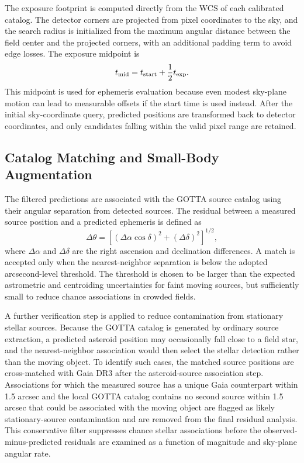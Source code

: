 \documentclass[referee]{raa}
\begin{document}
The exposure footprint is computed directly from the WCS of each calibrated catalog. The detector corners are projected from pixel coordinates to the sky, and the search radius is initialized from the maximum angular distance between the field center and the projected corners, with an additional padding term to avoid edge losses. The exposure midpoint is
\begin{equation}
t_{\rm mid}=t_{\rm start}+\frac{1}{2}t_{\rm exp}.
\end{equation}
This midpoint is used for ephemeris evaluation because even modest sky-plane motion can lead to measurable offsets if the start time is used instead. After the initial sky-coordinate query, predicted positions are transformed back to detector coordinates, and only candidates falling within the valid pixel range are retained.

\subsection{Catalog Matching and Small-Body Augmentation}

The filtered predictions are associated with the GOTTA source catalog using their angular separation from detected sources. The residual between a measured source position and a predicted ephemeris is defined as
\begin{equation}
\Delta\theta =
\left[
(\Delta\alpha\cos\delta)^2 + (\Delta\delta)^2
\right]^{1/2},
\end{equation}
where $\Delta\alpha$ and $\Delta\delta$ are the right ascension and declination differences. A match is accepted only when the nearest-neighbor separation is below the adopted arcsecond-level threshold. The threshold is chosen to be larger than the expected astrometric and centroiding uncertainties for faint moving sources, but sufficiently small to reduce chance associations in crowded fields.

A further verification step is applied to reduce contamination from stationary stellar sources. Because the GOTTA catalog is generated by ordinary source extraction, a predicted asteroid position may occasionally fall close to a field star, and the nearest-neighbor association would then select the stellar detection rather than the moving object. To identify such cases, the matched source positions are cross-matched with Gaia DR3 \citep{Gaia2023} after the asteroid-source association step. Associations for which the measured source has a unique Gaia counterpart within 1.5 arcsec and the local GOTTA catalog contains no second source within 1.5 arcsec that could be associated with the moving object are flagged as likely stationary-source contamination and are removed from the final residual analysis. This conservative filter suppresses chance stellar associations before the observed-minus-predicted residuals are examined as a function of magnitude and sky-plane angular rate.
\end{document}
